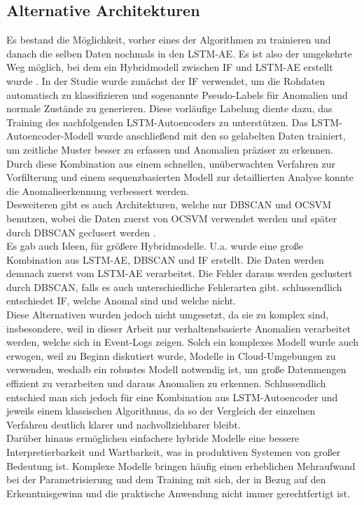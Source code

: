 \documentclass[a4paper,12pt]{article}
\begin{document}
	\subsection{Alternative Architekturen}
	Es bestand die Möglichkeit, vorher eines der Algorithmen zu trainieren und danach die selben Daten nochmals in den LSTM-AE. Es ist also der umgekehrte Weg möglich, bei dem ein Hybridmodell zwischen IF und LSTM-AE erstellt wurde \cite{priyanto2021combination}. In der Studie wurde zunächst der IF verwendet, um die Rohdaten automatisch zu klassifizieren und sogenannte Pseudo-Labels für Anomalien und normale Zustände zu generieren. Diese vorläufige Labelung diente dazu, das Training des nachfolgenden LSTM-Autoencoders zu unterstützen. Das LSTM-Autoencoder-Modell wurde anschließend mit den so gelabelten Daten trainiert, um zeitliche Muster besser zu erfassen und Anomalien präziser zu erkennen. Durch diese Kombination aus einem schnellen, unüberwachten Verfahren zur Vorfilterung und einem sequenzbasierten Modell zur detaillierten Analyse konnte die Anomalieerkennung verbessert werden.
	\\[0.5em]
	Desweiteren gibt es auch Architekturen, welche nur DBSCAN und OCSVM benutzen, wobei die Daten zuerst von OCSVM verwendet werden und später durch DBSCAN geclusert werden \cite{pu2021hybrid}.
	\\[0.5em]
	Es gab auch Ideen, für größere Hybridmodelle. U.a. wurde eine große Kombination aus LSTM-AE, DBSCAN und IF erstellt. Die Daten werden demnach zuerst vom LSTM-AE verarbeitet. Die Fehler daraus werden geclustert durch DBSCAN, falls es auch unterschiedliche Fehlerarten gibt. schlussendlich entschiedet IF, welche Anomal sind und welche nicht.
	\\[0.5em]
	Diese Alternativen wurden jedoch nicht umgesetzt, da sie zu komplex sind, insbesondere, weil in dieser Arbeit nur verhaltensbasierte Anomalien verarbeitet werden, welche sich in Event-Logs zeigen. Solch ein komplexes Modell wurde auch erwogen, weil zu Beginn diskutiert wurde, Modelle in Cloud-Umgebungen zu verwenden, weshalb ein robustes Modell notwendig ist, um große Datenmengen effizient zu verarbeiten und daraus Anomalien zu erkennen. Schlussendlich entschied man sich jedoch für eine Kombination aus LSTM-Autoencoder und jeweils einem klassischen Algorithmus, da so der Vergleich der einzelnen Verfahren deutlich klarer und nachvollziehbarer bleibt.
	\\[0.5em]
	Darüber hinaus ermöglichen einfachere hybride Modelle eine bessere Interpretierbarkeit und Wartbarkeit, was in produktiven Systemen von großer Bedeutung ist. Komplexe Modelle bringen häufig einen erheblichen Mehraufwand bei der Parametrisierung und dem Training mit sich, der in Bezug auf den Erkenntnisgewinn und die praktische Anwendung nicht immer gerechtfertigt ist.
\end{document}
